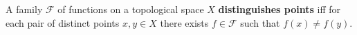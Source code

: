 A family $\mathcal{F}$ of functions on a topological space $X$ \textbf{distinguishes points} iff for each pair of distinct points $x, y \in X$ there exists $f \in \mathcal{F}$ such that $f(x) \neq f(y)$.
